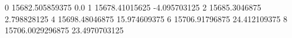 0 15682.505859375 0.0
1 15678.41015625 -4.095703125
2 15685.3046875 2.798828125
4 15698.48046875 15.974609375
6 15706.91796875 24.412109375
8 15706.0029296875 23.4970703125
